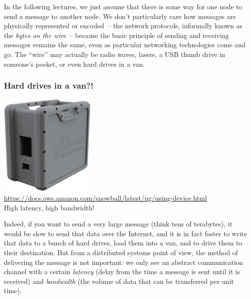 In the following lectures, we just assume that there is some way for one node to send a message to another node.
We don't particularly care how messages are physically represented or encoded~-- the network protocols, informally known as the \emph{bytes on the wire}~-- because the basic principle of sending and receiving messages remains the same, even as particular networking technologies come and go.
The ``wire'' may actually be radio waves, lasers, a USB thumb drive in someone's pocket, or even hard drives in a van.

\begin{frame}[plain]
    \label{s:snowball}
    \frametitle{Hard drives in a van?!}
    \begin{center}
        \includegraphics[height=5cm]{images/aws-snowball.png}\\[0.5em]
        {\scriptsize\url{https://docs.aws.amazon.com/snowball/latest/ug/using-device.html}}\\[1em]
        High latency, high bandwidth!
    \end{center}
\end{frame}

Indeed, if you want to send a very large message (think tens of terabytes), it would be slow to send that data over the Internet, and it is in fact faster to write that data to a bunch of hard drives, load them into a van, and to drive them to their destination.
But from a distributed systems point of view, the method of delivering the message is not important: we only see an abstract communication channel with a certain \emph{latency} (delay from the time a message is sent until it is received) and \emph{bandwidth} (the volume of data that can be transferred per unit time).

